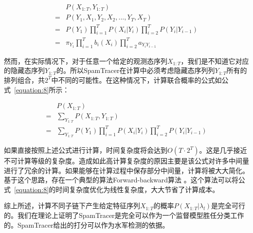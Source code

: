 \begin{equation}
\label{equation:7}
\begin{aligned}
& P(X_{1:T}, Y_{1:T})\\
= & P(Y_1, X_1, Y_2, X_2,...,Y_T, X_T)\\
= & P(Y_1)\prod_{i=1}^{T}{P(X_i|Y_i)}\prod_{i=2}^{T}{P(Y_i|Y_{i-1})}\\
= & \pi_{Y_1}\prod_{i=1}^{T}{b_i(X_i)}\prod_{i=2}^{T}{a_{Y_i Y_{i-1}}}
\end{aligned}
\end{equation}


然而，在实际情况下，对于任意一个给定的观测态序列$X_{1:T}$，我们是不知道它对应的隐藏态序列$Y_{1:T}$的。所以SpamTracer在计算中必须考虑隐藏态序列列$Y_{1:T}$所有的排列组合，共$2^T$中不同的可能性。在这种情况下，计算联合概率的公式如公式~\eqref{equation:8}所示：

\begin{equation}
\label{equation:8}
\begin{aligned}
& P(X_{1:T})\\
= & \sum_{Y_{1:T}} P(X_{1:T}, Y_{1:T})\\
= & \sum_{Y_{1:T}} P(Y_1)\prod_{i=1}^{T}{P(X_i|Y_i)}\prod_{i=2}^{T}{P(Y_i|Y_{i-1})}
\end{aligned}
\end{equation}

如果直接按照上述公式进行计算，时间复杂度将会达到$O(T\cdot2^T)$。这是几乎接近不可计算等级的复杂度。造成如此高计算复杂度的原因主要是该公式对许多中间量进行了冗余的计算。如果能够在计算过程中保存部分中间量，计算将被大大简化。基于这个思路，存在一个典型的算法Forward-backward算法 \cite{Rabiner:1989}。这个算法可以将公式~\eqref{equation:8}的时间复杂度优化为线性复杂度，大大节省了计算成本。

综上所述，计算不同子链下产生给定特征序列$X_{1:T}$的概率$P(X_{1:T} | \lambda_l)$是完全可行的。我们在理论上证明了SpamTracer是完全可以作为一个监督模型胜任分类工作的。SpamTracer给出的打分可以作为水军检测的依据。


